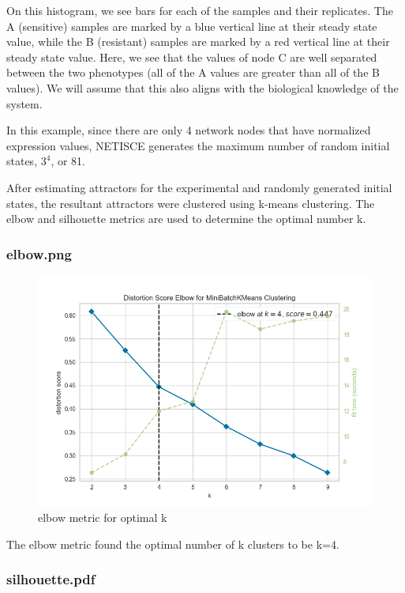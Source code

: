 \documentclass[
]{book}
\theoremstyle{definition}
\theoremstyle{definition}
\theoremstyle{definition}
\theoremstyle{definition}
\theoremstyle{remark}
\begin{document}
On this histogram, we see bars for each of the samples and their replicates. The A (sensitive) samples are marked by a blue vertical line at their steady state value, while the B (resistant) samples are marked by a red vertical line at their steady state value. Here, we see that the values of node C are well separated between the two phenotypes (all of the A values are greater than all of the B values). We will assume that this also aligns with the biological knowledge of the system.

In this example, since there are only 4 network nodes that have normalized expression values, NETISCE generates the maximum number of random initial states, \(3^4\), or 81.

After estimating attractors for the experimental and randomly generated initial states, the resultant attractors were clustered using k-means clustering. The elbow and silhouette metrics are used to determine the optimal number k.

\hypertarget{section-id}{%
\subsubsection*{elbow.png}\label{section-id}}

\begin{figure}

{\centering \includegraphics[width=0.5\linewidth]{results/elbow} 

}

\caption{elbow metric for optimal k}\label{fig:unnamed-chunk-10}
\end{figure}

The elbow metric found the optimal number of k clusters to be k=4.

\hypertarget{section-id}{%
\subsubsection*{silhouette.pdf}\label{section-id}}
\end{document}

